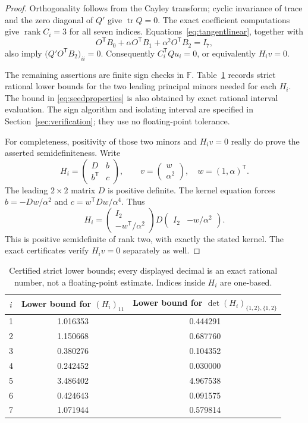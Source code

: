 \documentclass[11pt]{article}
\theoremstyle{definition}
\newcommand{\F}{\mathbb F}
\newcommand{\rank}{\operatorname{rank}}
\newcommand{\tr}{\operatorname{tr}}
\newcommand{\trans}{^{\mathsf T}}
\numberwithin{equation}{section}
\begin{document}
\begin{proof}
Orthogonality follows from the Cayley transform; cyclic invariance of trace
and the zero diagonal of $Q'$ give $\tr Q=0$.
The exact coefficient computations give $\rank C_i=3$ for all seven
indices. Equations~\eqref{eq:tangentlinear}, together with
\[
 O\trans B_0+\alpha O\trans B_1+\alpha^2O\trans B_2=I_7,
\]
also imply $\bigl(Q'O\trans B_2\bigr)_{ii}=0$. Consequently
$C_i\trans Q u_i=0$, or equivalently $H_iv=0$.

The remaining assertions are finite sign checks in $\F$. Table~\ref{tab:local}
records strict rational lower bounds for the two leading principal minors
needed for each $H_i$. The bound in \eqref{eq:seedproperties} is also obtained
by exact rational interval evaluation. The sign algorithm and isolating
interval are specified in Section~\ref{sec:verification}; they use no
floating-point tolerance.

For completeness, positivity of those two minors and $H_iv=0$ really do
prove the asserted semidefiniteness. Write
\[
 H_i=\begin{pmatrix}D&b\\b\trans&c\end{pmatrix},\qquad
 v=\begin{pmatrix}w\\\alpha^2\end{pmatrix},\quad w=(1,\alpha)\trans.
\]
The leading $2\times2$ matrix $D$ is positive definite. The kernel equation
forces $b=-Dw/\alpha^2$ and $c=w\trans Dw/\alpha^4$. Thus
\begin{equation}\label{eq:localPSD}
 H_i=
 \begin{pmatrix}I_2\\-w\trans/\alpha^2\end{pmatrix}
 D
 \begin{pmatrix}I_2&-w/\alpha^2\end{pmatrix}.
\end{equation}
This is positive semidefinite of rank two, with exactly the stated kernel.
The exact certificates verify $H_iv=0$ separately as well.
\end{proof}

\begin{table}[ht]
\centering
\caption{Certified strict lower bounds; every displayed decimal is an exact
rational number, not a floating-point estimate. Indices inside $H_i$ are
one-based.}\label{tab:local}
\begin{tabular}{ccc}
\toprule
$i$ & Lower bound for $(H_i)_{11}$ & Lower bound for
$\det(H_i)_{\{1,2\},\{1,2\}}$\\
\midrule
1&1.016353&0.444291\\
2&1.150668&0.687760\\
3&0.380276&0.104352\\
4&0.242452&0.030000\\
5&3.486402&4.967538\\
6&0.424643&0.091575\\
7&1.071944&0.579814\\
\bottomrule
\end{tabular}
\end{table}
\end{document}
